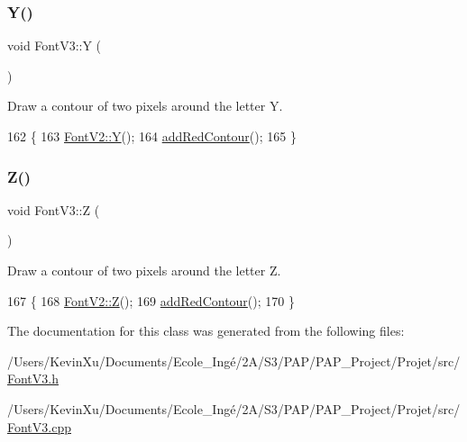 \subsubsection{\texorpdfstring{Y()}{Y()}}
{\footnotesize\ttfamily void Font\+V3\+::Y (\begin{DoxyParamCaption}{ }\end{DoxyParamCaption})}



Draw a contour of two pixels around the letter Y. 


\begin{DoxyCode}
162                \{
163     \mbox{\hyperlink{class_font_v2_a858b25a33231fe1a78539d040e59f0ee}{FontV2::Y}}();
164     \mbox{\hyperlink{class_font_v3_a639f1eac0eb6724463813270f47e2696}{addRedContour}}();
165 \}
\end{DoxyCode}
\mbox{\label{class_font_v3_a9f3a3741efc867b560459c8dc8b661ee}} 
\subsubsection{\texorpdfstring{Z()}{Z()}}
{\footnotesize\ttfamily void Font\+V3\+::Z (\begin{DoxyParamCaption}{ }\end{DoxyParamCaption})}



Draw a contour of two pixels around the letter Z. 


\begin{DoxyCode}
167                \{
168     \mbox{\hyperlink{class_font_v2_a9650b871667f1c226d6e0e042f311a51}{FontV2::Z}}();
169     \mbox{\hyperlink{class_font_v3_a639f1eac0eb6724463813270f47e2696}{addRedContour}}();
170 \}
\end{DoxyCode}


The documentation for this class was generated from the following files\+:\begin{DoxyCompactItemize}
\item 
/\+Users/\+Kevin\+Xu/\+Documents/\+Ecole\+\_\+\+Ingé/2\+A/\+S3/\+P\+A\+P/\+P\+A\+P\+\_\+\+Project/\+Projet/src/\mbox{\hyperlink{_font_v3_8h}{Font\+V3.\+h}}\item 
/\+Users/\+Kevin\+Xu/\+Documents/\+Ecole\+\_\+\+Ingé/2\+A/\+S3/\+P\+A\+P/\+P\+A\+P\+\_\+\+Project/\+Projet/src/\mbox{\hyperlink{_font_v3_8cpp}{Font\+V3.\+cpp}}\end{DoxyCompactItemize}

